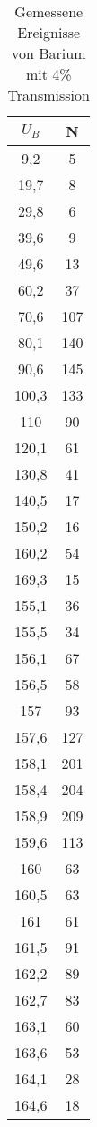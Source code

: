 \begin{table}
\centering
\caption{Gemessene Ereignisse von Barium mit 4\% Transmission}
\begin{tabular}{cc}
\toprule
$U_B$ & N\\
\midrule
9,2&	5\\
19,7&	8\\
29,8&	6\\
39,6&	9\\
49,6&	13\\
60,2&	37\\
70,6&	107\\
80,1&	140\\
90,6&	145\\
100,3&	133\\
110&	90\\
120,1&	61\\
130,8&	41\\
140,5&	17\\
150,2&	16\\
160,2&	54\\
169,3&	15\\
155,1&  36\\
155,5&	34\\
156,1&	67\\
156,5&	58\\
157&	93\\
157,6&	127\\
158,1&	201\\
158,4&	204\\
158,9&	209\\
159,6&	113\\
160&	63\\
160,5&	63\\
161&	61\\
161,5&	91\\
162,2&	89\\
162,7&	83\\
163,1&	60\\
163,6&	53\\
164,1&	28\\
164,6&	18\\
\bottomrule
\end{tabular}
\label{tab:fein}
\end{table}

